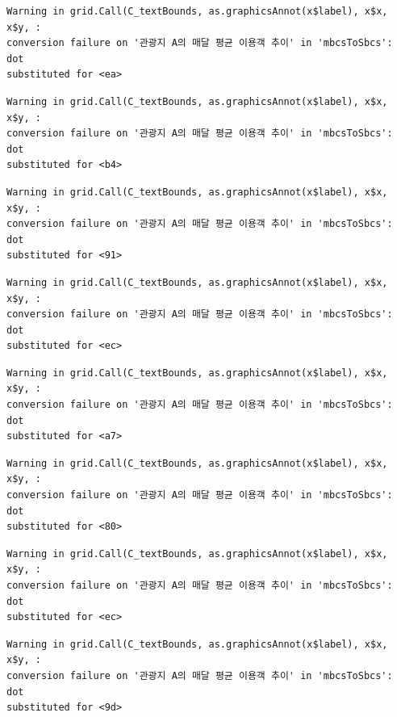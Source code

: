 \documentclass[
  letterpaper,
  DIV=11,
  numbers=noendperiod]{scrreprt}
\begin{document}
\begin{verbatim}
Warning in grid.Call(C_textBounds, as.graphicsAnnot(x$label), x$x, x$y, :
conversion failure on '관광지 A의 매달 평균 이용객 추이' in 'mbcsToSbcs': dot
substituted for <ea>
\end{verbatim}

\begin{verbatim}
Warning in grid.Call(C_textBounds, as.graphicsAnnot(x$label), x$x, x$y, :
conversion failure on '관광지 A의 매달 평균 이용객 추이' in 'mbcsToSbcs': dot
substituted for <b4>
\end{verbatim}

\begin{verbatim}
Warning in grid.Call(C_textBounds, as.graphicsAnnot(x$label), x$x, x$y, :
conversion failure on '관광지 A의 매달 평균 이용객 추이' in 'mbcsToSbcs': dot
substituted for <91>
\end{verbatim}

\begin{verbatim}
Warning in grid.Call(C_textBounds, as.graphicsAnnot(x$label), x$x, x$y, :
conversion failure on '관광지 A의 매달 평균 이용객 추이' in 'mbcsToSbcs': dot
substituted for <ec>
\end{verbatim}

\begin{verbatim}
Warning in grid.Call(C_textBounds, as.graphicsAnnot(x$label), x$x, x$y, :
conversion failure on '관광지 A의 매달 평균 이용객 추이' in 'mbcsToSbcs': dot
substituted for <a7>
\end{verbatim}

\begin{verbatim}
Warning in grid.Call(C_textBounds, as.graphicsAnnot(x$label), x$x, x$y, :
conversion failure on '관광지 A의 매달 평균 이용객 추이' in 'mbcsToSbcs': dot
substituted for <80>
\end{verbatim}

\begin{verbatim}
Warning in grid.Call(C_textBounds, as.graphicsAnnot(x$label), x$x, x$y, :
conversion failure on '관광지 A의 매달 평균 이용객 추이' in 'mbcsToSbcs': dot
substituted for <ec>
\end{verbatim}

\begin{verbatim}
Warning in grid.Call(C_textBounds, as.graphicsAnnot(x$label), x$x, x$y, :
conversion failure on '관광지 A의 매달 평균 이용객 추이' in 'mbcsToSbcs': dot
substituted for <9d>
\end{verbatim}
\end{document}
